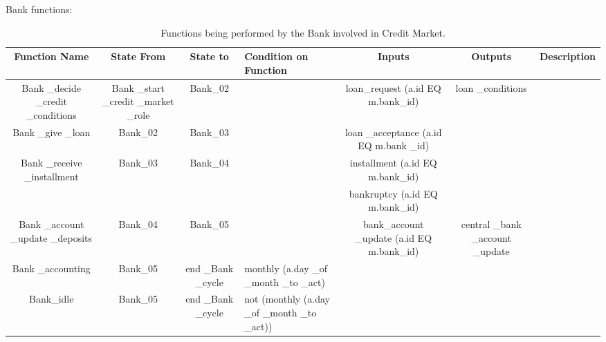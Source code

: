 Bank functions:
\begin{landscape}
\begin{table}[!htb]\caption{Functions being performed by the Bank involved in Credit Market.}
\begin{center}
\begin{tabular}{|c|c|c|l|c|c|l|}
\hline
Function Name & State From & State to & Condition on Function & Inputs & Outputs & Description \\
\hline

{\parbox[l]{3cm}{Bank \_decide \_credit \_conditions}} &
{\parbox[l]{3cm}{Bank \_start \_credit \_market \_role}} & Bank\_02
& & {\parbox[l]{3cm}{loan\_request (a.id EQ m.bank\_id)}} &
{\parbox[l]{3cm}{loan \_conditions}} &\\

\hline

{\parbox[l]{3cm}{Bank \_give \_loan}} & Bank\_02 & Bank\_03 & &
{\parbox[l]{3cm}{loan \_acceptance (a.id EQ m.bank \_id)}} &  &\\

\hline

{\parbox[l]{3cm}{Bank \_receive \_installment}} & Bank\_03 &
Bank\_04 & &
{\parbox[l]{3cm}{installment (a.id EQ m.bank\_id)}} & & \\

&&&&
{\parbox[l]{3cm}{bankruptcy (a.id EQ m.bank\_id)}} &  &\\

\hline


{\parbox[l]{3cm}{Bank \_account \_update \_deposits}} & Bank\_04 &
Bank\_05 & & {\parbox[l]{3cm}{bank\_account \_update (a.id EQ
m.bank\_id)}} &
{\parbox[l]{3cm}{central \_bank \_account \_update}} &\\

\hline


{\parbox[l]{3cm}{Bank \_accounting}} & Bank\_05 &
{\parbox[l]{3cm}{end \_Bank \_cycle}} &
{\parbox[l]{4cm}{monthly (a.day \_of \_month \_to \_act)}}&  &  &\\

\hline


{\parbox[l]{3cm}{Bank\_idle}} & Bank\_05 & {\parbox[l]{3cm}{end
\_Bank \_cycle}} &
{\parbox[l]{4cm}{not (monthly (a.day \_of \_month \_to \_act))}}&  &  &\\
\hline


\end{tabular}\end{center}\label{tab:creditbankfn}
\end{table}
\end{landscape}

